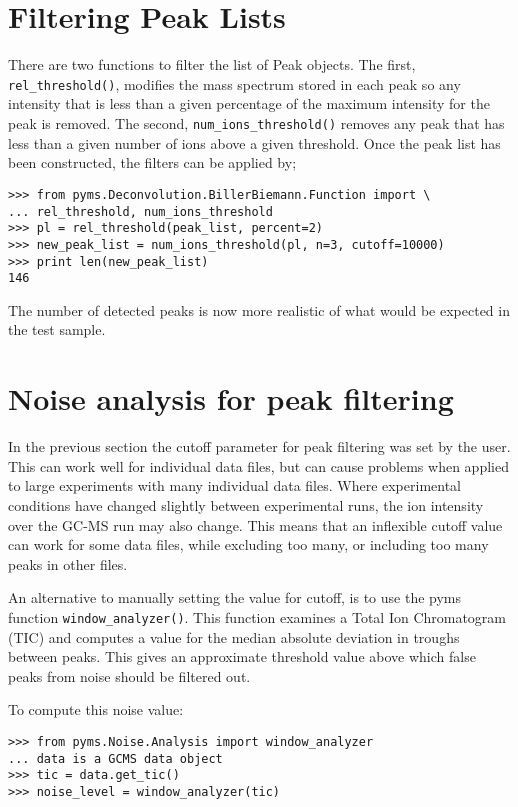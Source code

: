 \section{Filtering Peak Lists}


There are two functions to filter the list of Peak objects. The first, {\tt
rel\_threshold()}, modifies the mass spectrum stored in each peak so any
intensity that is less than a given percentage of the maximum intensity for the
peak is removed. The second, {\tt num\_ions\_threshold()} removes any peak that
has less than a given number of ions above a given threshold. Once the peak
list has been constructed, the filters can be applied by;

\begin{verbatim}
>>> from pyms.Deconvolution.BillerBiemann.Function import \
... rel_threshold, num_ions_threshold
>>> pl = rel_threshold(peak_list, percent=2)
>>> new_peak_list = num_ions_threshold(pl, n=3, cutoff=10000)
>>> print len(new_peak_list)
146
\end{verbatim}

The number of detected peaks is now more realistic of what would be expected in
the test sample.

\section{Noise analysis for peak filtering}

In the previous section the cutoff parameter for peak filtering was set by the
user. This can work well for individual data files, but can cause problems when
applied to large experiments with many individual data files. Where experimental 
conditions have changed slightly between experimental runs, the ion intensity over
the GC-MS run may also change. This means that an inflexible cutoff value can
work for some data files, while excluding too many, or including too many peaks in
other files.

An alternative to manually setting the value for cutoff, is to use the pyms function
{\tt window\_analyzer()}. This function examines a Total Ion Chromatogram (TIC) and 
computes a value for the median absolute deviation in troughs between peaks. This 
gives an approximate threshold value above which false peaks from noise should
be filtered out.

To compute this noise value:
\begin{verbatim}
>>> from pyms.Noise.Analysis import window_analyzer
... data is a GCMS data object
>>> tic = data.get_tic()
>>> noise_level = window_analyzer(tic)
\end{verbatim}

